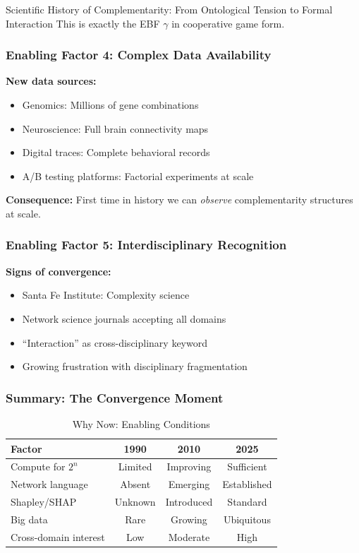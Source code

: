 \begin{chapter}{Scientific History of Complementarity: From Ontological Tension to Formal Interaction}
This is exactly the EBF $\gamma$ in cooperative game form.

\subsubsection{Enabling Factor 4: Complex Data Availability}

\textbf{New data sources:}
\begin{itemize}[noitemsep]
    \item Genomics: Millions of gene combinations
    \item Neuroscience: Full brain connectivity maps
    \item Digital traces: Complete behavioral records
    \item A/B testing platforms: Factorial experiments at scale
\end{itemize}

\textbf{Consequence:} First time in history we can \textit{observe} complementarity structures at scale.

\subsubsection{Enabling Factor 5: Interdisciplinary Recognition}

\textbf{Signs of convergence:}
\begin{itemize}[noitemsep]
    \item Santa Fe Institute: Complexity science
    \item Network science journals accepting all domains
    \item ``Interaction'' as cross-disciplinary keyword
    \item Growing frustration with disciplinary fragmentation
\end{itemize}

\subsubsection{Summary: The Convergence Moment}

\begin{table}[h]
\centering
\caption{Why Now: Enabling Conditions}
\label{tab:why-now}
\renewcommand{\arraystretch}{1.3}
\begin{tabular}{@{}lccc@{}}
\toprule
\textbf{Factor} & \textbf{1990} & \textbf{2010} & \textbf{2025} \\
\midrule
Compute for $2^n$ & Limited & Improving & Sufficient \\
Network language & Absent & Emerging & Established \\
Shapley/SHAP & Unknown & Introduced & Standard \\
Big data & Rare & Growing & Ubiquitous \\
Cross-domain interest & Low & Moderate & High \\
\bottomrule
\end{tabular}
\end{table}


\end{chapter}
